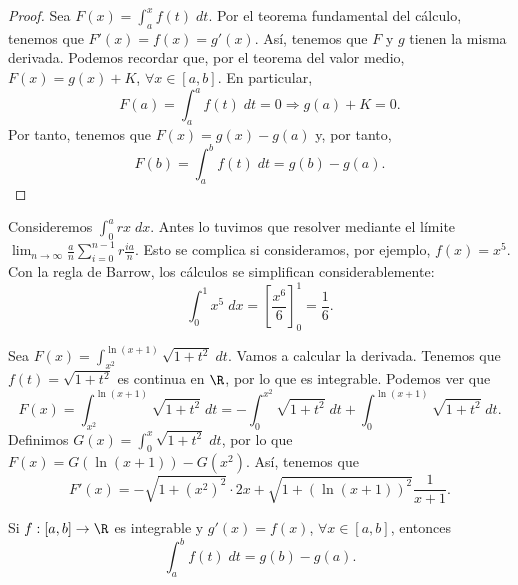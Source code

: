 \begin{proof}
	Sea $\displaystyle F\left(x\right) = \int^{x}_{a} f\left(t\right) \; dt $. Por el teorema fundamental del cálculo, tenemos que $\displaystyle F'\left(x\right) = f\left(x\right) = g'\left(x\right) $. Así, tenemos que $\displaystyle F $ y $\displaystyle g $ tienen la misma derivada. Podemos recordar que, por el teorema del valor medio, $\displaystyle F\left(x\right) = g\left(x\right) + K $, $\displaystyle \forall x \in [a,b] $. 
	En particular,
	\[ F\left(a\right) =\int^{a}_{a} f\left(t\right) \; dt = 0 \Rightarrow g\left(a\right) + K = 0.\]
	Por tanto, tenemos que $\displaystyle F\left(x\right) = g\left(x\right)-g\left(a\right) $ y, por tanto,
	\[F\left(b\right) = \int^{b}_{a} f\left(t\right) \; dt = g\left(b\right)-g\left(a\right) .\]
\end{proof}
\begin{eg}
\normalfont Consideremos $\displaystyle \int^{a}_{0} rx \; dx $. Antes lo tuvimos que resolver mediante el límite $\displaystyle \lim_{n \to \infty}\frac{a}{n}\sum^{n-1}_{i=0}r\frac{ia}{n} $. Esto se complica si consideramos, por ejemplo, $\displaystyle f\left(x\right) = x^{5} $. Con la regla de Barrow, los cálculos se simplifican considerablemente:
\[ \int^{1}_{0} x^{5} \; dx = \left[\frac{x^{6}}{6}\right] ^{1}_{0} = \frac{1}{6} .\]
\end{eg}
\begin{eg}
\normalfont Sea $\displaystyle F\left(x\right) = \int^{\ln\left(x+1\right)}_{x^{2}} \sqrt{1 + t ^{2}} \; dt $. Vamos a calcular la derivada. Tenemos que $\displaystyle f\left(t\right) = \sqrt{1 + t ^{2}} $ es continua en $\displaystyle \R $, por lo que es integrable. Podemos ver que 
\[ F\left(x\right) = \int^{\ln\left(x+1\right)}_{x^{2}} \sqrt{1 + t ^{2}} \; dt = - \int^{x^{2}}_{0} \sqrt{1 + t ^{2}} \; dt + \int^{\ln\left(x+1\right)}_{0} \sqrt{1 + t ^{2}} \; dt .\]
Definimos $\displaystyle G\left(x\right) = \int^{x}_{0} \sqrt{1 + t ^{2}} \; dt $, por lo que $\displaystyle F\left(x\right) = G\left(\ln\left(x+1\right)\right)-G\left(x^{2}\right) $. Así, tenemos que
\[ F'\left(x\right) = -\sqrt{1 + \left(x^{2}\right)^{2}} \cdot2x + \sqrt{1 + \left(\ln\left(x+1\right)\right)^{2}}\frac{1}{x+1}.\]
\end{eg}
\begin{ftheorem}
	\normalfont Si $\displaystyle f : \left[a,b\right] \to \R $ es integrable y $\displaystyle g'\left(x\right) = f\left(x\right) $, $\displaystyle \forall x \in \left[a,b\right]  $, entonces 
	\[ \int^{b}_{a} f\left(t\right) \; dt = g\left(b\right)-g\left(a\right) .\]
\end{ftheorem}
